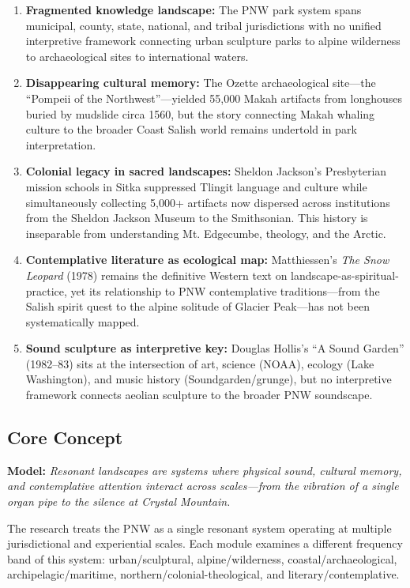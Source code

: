 \documentclass[11pt,letterpaper]{article}
\begin{document}
\begin{enumerate}[leftmargin=2em]
\item \textbf{Fragmented knowledge landscape:} The PNW park system spans municipal, county, state, national, and tribal jurisdictions with no unified interpretive framework connecting urban sculpture parks to alpine wilderness to archaeological sites to international waters.
\item \textbf{Disappearing cultural memory:} The Ozette archaeological site---the ``Pompeii of the Northwest''---yielded 55,000 Makah artifacts from longhouses buried by mudslide circa 1560, but the story connecting Makah whaling culture to the broader Coast Salish world remains undertold in park interpretation.
\item \textbf{Colonial legacy in sacred landscapes:} Sheldon Jackson's Presbyterian mission schools in Sitka suppressed Tlingit language and culture while simultaneously collecting 5,000+ artifacts now dispersed across institutions from the Sheldon Jackson Museum to the Smithsonian. This history is inseparable from understanding Mt. Edgecumbe, theology, and the Arctic.
\item \textbf{Contemplative literature as ecological map:} Matthiessen's \textit{The Snow Leopard} (1978) remains the definitive Western text on landscape-as-spiritual-practice, yet its relationship to PNW contemplative traditions---from the Salish spirit quest to the alpine solitude of Glacier Peak---has not been systematically mapped.
\item \textbf{Sound sculpture as interpretive key:} Douglas Hollis's ``A Sound Garden'' (1982--83) sits at the intersection of art, science (NOAA), ecology (Lake Washington), and music history (Soundgarden/grunge), but no interpretive framework connects aeolian sculpture to the broader PNW soundscape.
\end{enumerate}

\subsection{Core Concept}

\textbf{Model:} \textit{Resonant landscapes are systems where physical sound, cultural memory, and contemplative attention interact across scales---from the vibration of a single organ pipe to the silence at Crystal Mountain.}

The research treats the PNW as a single resonant system operating at multiple jurisdictional and experiential scales. Each module examines a different frequency band of this system: urban/sculptural, alpine/wilderness, coastal/archaeological, archipelagic/maritime, northern/colonial-theological, and literary/contemplative.
\end{document}
